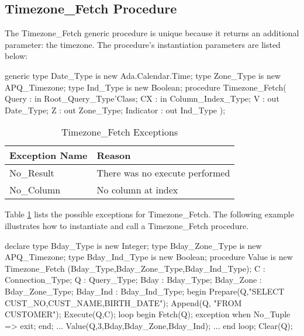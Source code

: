 \documentclass[english,letterpaper]{book}
\begin{document}
\subsection{Timezone\_Fetch Procedure}

The Timezone\_Fetch generic procedure is unique because it returns
an additional parameter: the timezone. The procedure's
instantiation parameters are listed below:

\begin{Code}
generic
   type Date_Type is new Ada.Calendar.Time;
   type Zone_Type is new APQ_Timezone;
   type Ind_Type is new Boolean;
procedure Timezone_Fetch(
   Query :     in     Root_Query_Type'Class;
   CX :        in     Column_Index_Type;
   V :            out Date_Type;
   Z :            out Zone_Type;
   Indicator :    out Ind_Type
);
\end{Code}

\begin{table}
   \begin{center}
      \begin{tabular}{ll}
         Exception Name       &  Reason\\
         \hline 
         No\_Result           &  There was no execute performed\\
         No\_Column           &  No column at index\\
      \end{tabular}
   \end{center}
   \caption{Timezone\_Fetch Exceptions}\label{t:tzfx}
\end{table}

Table \ref{t:tzfx} lists the possible exceptions for Timezone\_Fetch.
The following example illustrates how to instantiate and call a Timezone\_Fetch
procedure.

\begin{Example}
declare
   type Bday_Type is new Integer;
   type Bday_Zone_Type is new APQ_Timezone;
   type Bday_Ind_Type is new Boolean;
   procedure Value is new Timezone_Fetch
      (Bday_Type,Bday_Zone_Type,Bday_Ind_Type);
   C :              Connection_Type;
   Q :              Query_Type;
   Bday :           Bday_Type;
   Bday_Zone :      Bday_Zone_Type;
   Bday_Ind :       Bday_Ind_Type;
begin
   Prepare(Q,"SELECT CUST_NO,CUST_NAME,BIRTH_DATE");
   Append(Q, "FROM CUSTOMER");
   Execute(Q,C);
   loop
      begin
         Fetch(Q);
      exception
         when No_Tuple =>
            exit;
      end;
      ...
      Value(Q,3,Bday,Bday_Zone,Bday_Ind);
      ...
   end loop;
   Clear(Q);
\end{Example}
\end{document}
